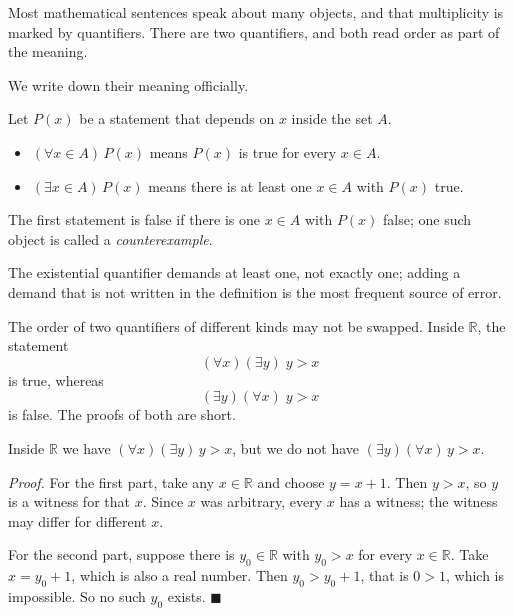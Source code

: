 Most mathematical sentences speak about many objects, and that multiplicity is
marked by quantifiers. There are two quantifiers, and both read order as part of the meaning.


We write down their meaning officially.

\begin{definisi}
Let $P(x)$ be a statement that depends on $x$ inside the set $A$.
\begin{itemize}
  \item $(\forall x \in A)\,P(x)$ means $P(x)$ is true for every $x \in A$.
  \item $(\exists x \in A)\,P(x)$ means there is at least one $x \in A$
        with $P(x)$ true.
\end{itemize}
The first statement is false if there is one $x \in A$ with $P(x)$ false; one such
object is called a \emph{counterexample}.
\end{definisi}

The existential quantifier demands at least one, not exactly one; adding a demand
that is not written in the definition is the most frequent source of error.

The order of two quantifiers of different kinds may not be swapped. Inside $\mathbb{R}$,
the statement
\[
  (\forall x)(\exists y)\; y > x
\]
is true, whereas
\[
  (\exists y)(\forall x)\; y > x
\]
is false. The proofs of both are short.

\begin{proposisi}
Inside $\mathbb{R}$ we have $(\forall x)(\exists y)\, y > x$, but we do not have
$(\exists y)(\forall x)\, y > x$.
\end{proposisi}
\par\smallskip\noindent\textit{Proof.} For the first part, take any $x \in \mathbb{R}$
and choose $y = x+1$. Then $y > x$, so $y$ is a witness for that $x$.
Since $x$ was arbitrary, every $x$ has a witness; the witness may differ for different
$x$.

For the second part, suppose there is $y_{0} \in \mathbb{R}$ with $y_{0} > x$ for
every $x \in \mathbb{R}$. Take $x = y_{0}+1$, which is also a real number. Then
$y_{0} > y_{0}+1$, that is $0 > 1$, which is impossible. So no such $y_{0}$
exists.
\hfill$\blacksquare${\parfillskip=0pt\par}

